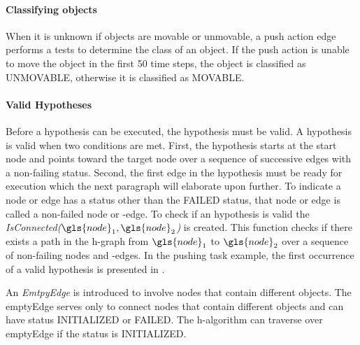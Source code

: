 \paragraph{Classifying objects}
When it is unknown if objects are movable or unmovable, a push action edge performs a tests to determine the class of an object. If the push action is unable to move the object in the first 50 time steps, the object is classified as UNMOVABLE, otherwise it is classified as MOVABLE.\bs

\paragraph{Valid Hypotheses}
Before a hypothesis can be executed, the hypothesis must be valid. A hypothesis is valid when two conditions are met. First, the hypothesis starts at the start node and points toward the target node over a sequence of successive edges with a non-failing status. Second, the first edge in the hypothesis must be ready for execution which the next paragraph will elaborate upon further. To indicate a node or edge has a status other than the FAILED status, that node or edge is called a non-failed node or -edge. To check if an hypothesis is valid the \textit{IsConnected($\gls{node}_1, \gls{node}_2$)} is created. This function checks if there exists a path in the \ac{h-graph} from $\gls{node}_1$ to $\gls{node}_2$ over a sequence of non-failing nodes and -edges. In the pushing task example, the first occurrence of a valid hypothesis is presented in .\bs

An \textit{EmtpyEdge} is introduced to involve nodes that contain different objects. The emptyEdge serves only to connect nodes that contain different objects and can have status INITIALIZED or FAILED. The \ac{h-algorithm} can traverse over emptyEdge if the status is INITIALIZED.\bs

